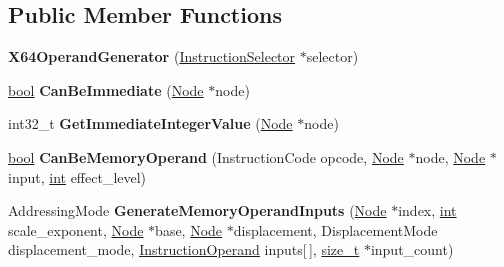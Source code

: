 \subsection*{Public Member Functions}
\begin{DoxyCompactItemize}
\item 
\mbox{\label{classv8_1_1internal_1_1compiler_1_1X64OperandGenerator_a2f123c8b3f3c98fe340ac808feaca428}} 
{\bfseries X64\+Operand\+Generator} (\mbox{\hyperlink{classv8_1_1internal_1_1compiler_1_1InstructionSelector}{Instruction\+Selector}} $\ast$selector)
\item 
\mbox{\label{classv8_1_1internal_1_1compiler_1_1X64OperandGenerator_aeea6d01288b05aa78636fbdb60b06200}} 
\mbox{\hyperlink{classbool}{bool}} {\bfseries Can\+Be\+Immediate} (\mbox{\hyperlink{classv8_1_1internal_1_1compiler_1_1Node}{Node}} $\ast$node)
\item 
\mbox{\label{classv8_1_1internal_1_1compiler_1_1X64OperandGenerator_a4fc6668955ffd8795ab1adf62d075b21}} 
int32\+\_\+t {\bfseries Get\+Immediate\+Integer\+Value} (\mbox{\hyperlink{classv8_1_1internal_1_1compiler_1_1Node}{Node}} $\ast$node)
\item 
\mbox{\label{classv8_1_1internal_1_1compiler_1_1X64OperandGenerator_ae56e894a714203086c0639e7745166fb}} 
\mbox{\hyperlink{classbool}{bool}} {\bfseries Can\+Be\+Memory\+Operand} (Instruction\+Code opcode, \mbox{\hyperlink{classv8_1_1internal_1_1compiler_1_1Node}{Node}} $\ast$node, \mbox{\hyperlink{classv8_1_1internal_1_1compiler_1_1Node}{Node}} $\ast$input, \mbox{\hyperlink{classint}{int}} effect\+\_\+level)
\item 
\mbox{\label{classv8_1_1internal_1_1compiler_1_1X64OperandGenerator_a1a9b8161d0be292813394d8596cafe3e}} 
Addressing\+Mode {\bfseries Generate\+Memory\+Operand\+Inputs} (\mbox{\hyperlink{classv8_1_1internal_1_1compiler_1_1Node}{Node}} $\ast$index, \mbox{\hyperlink{classint}{int}} scale\+\_\+exponent, \mbox{\hyperlink{classv8_1_1internal_1_1compiler_1_1Node}{Node}} $\ast$base, \mbox{\hyperlink{classv8_1_1internal_1_1compiler_1_1Node}{Node}} $\ast$displacement, Displacement\+Mode displacement\+\_\+mode, \mbox{\hyperlink{classv8_1_1internal_1_1compiler_1_1InstructionOperand}{Instruction\+Operand}} inputs\mbox{[}$\,$\mbox{]}, \mbox{\hyperlink{classsize__t}{size\+\_\+t}} $\ast$input\+\_\+count)

\end{DoxyCompactItemize}
